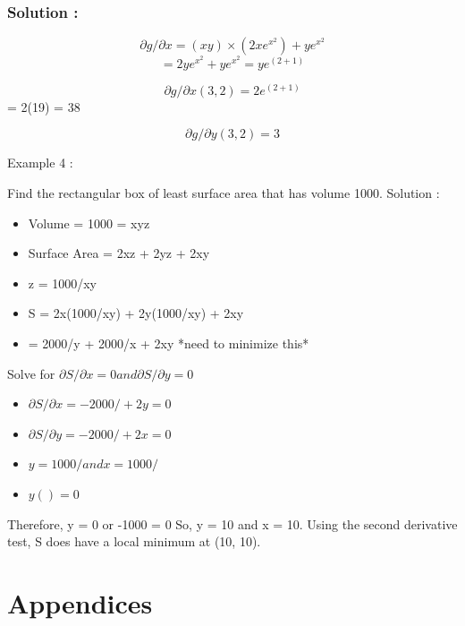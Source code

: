 \documentclass[]{article}
\begin{document}
\subsubsection*{Solution :}
\[\partial g/\partial x = (xy)\times(2xe^{x^2}) + ye^{x^2}\]
\[= 2ye^{x^2} + ye^{x^2} =ye^{(2+1)}\]


\[\partial g/\partial x (3,2) = 2e^(2+1)\]
= 2(19)
= 38

\[\partial g/\partial y (3,2) = 3\]

Example 4 :

Find the rectangular box of least surface area that has volume 1000.
Solution :
\begin{itemize}
	\item Volume = 1000 = xyz
	\item Surface Area = 2xz + 2yz + 2xy
	\item z = 1000/xy
	\item S = 2x(1000/xy) + 2y(1000/xy) + 2xy
	\item = 2000/y + 2000/x + 2xy *need to minimize this*
\end{itemize}
Solve for $\partial S/\partial x = 0 and \partial S/\partial y = 0$
\begin{itemize}
	\item $\partial S/\partial x = -2000/ + 2y = 0$
	\item $\partial S/\partial y = -2000/ + 2x = 0$
	\item $y = 1000/ and x = 1000/$
	\item $y() = 0$
\end{itemize}

Therefore, y = 0 or -1000 = 0
So, y = 10 and x = 10.
Using the second derivative test, S does have a local minimum at (10, 10).









\section*{Appendices}
\end{document}
